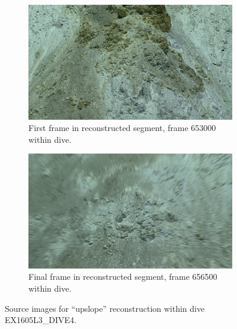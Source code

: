 \documentclass[letterpaper,12pt]{article}
\begin{document}
\begin{figure}
    \centering
    \begin{subfigure}[b]{0.48\textwidth}
        \includegraphics[width=\textwidth]{images/image_653000.png}
        \caption{First frame in reconstructed segment, frame 653000 within dive.}
        \label{fig:ex1605l3_dive4_upslope_begin}
    \end{subfigure}
    \begin{subfigure}[b]{0.48\textwidth}
        \includegraphics[width=\textwidth]{images/image_656500.png}
        \caption{Final frame in reconstructed segment, frame 656500 within dive.}
        \label{fig:ex1605l3_dive4_upslope_end}
    \end{subfigure}
    \caption{Source images for ``upslope'' reconstruction within dive EX1605L3\_DIVE4.}
\end{figure}
\end{document}
